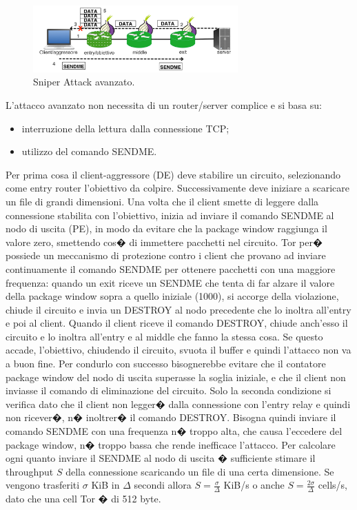 \begin{figure}[!htbp]
\centering
\includegraphics[width=0.7\textwidth]{./figure//sniperattack-advance+sendme}
\caption{Sniper Attack avanzato.}
\label{FIG:SniperAttackAdv }
\end{figure}

L'attacco avanzato non necessita di un router/server complice e si basa su:
\begin{itemize}
\item interruzione della lettura dalla connessione TCP;
\item utilizzo del comando {\ttfamily SENDME}.
\end{itemize}
Per prima cosa il client-aggressore (DE) deve stabilire un circuito, selezionando come entry router l'obiettivo da colpire. Successivamente deve iniziare a scaricare un file di grandi dimensioni.
Una volta che il client smette di leggere dalla connessione stabilita con l'obiettivo, inizia ad inviare il comando {\ttfamily SENDME} al nodo di uscita (PE), in modo da evitare che la package window raggiunga il valore zero, smettendo cos� di immettere pacchetti nel circuito.
Tor per� possiede un meccanismo di protezione contro i client che provano ad inviare continuamente il comando {\ttfamily SENDME} per ottenere pacchetti con una maggiore frequenza: quando un exit riceve un {\ttfamily SENDME} che tenta di far alzare il valore della package window sopra a quello iniziale (1000), si accorge della violazione, chiude il circuito e invia un {\ttfamily DESTROY} al nodo precedente che lo inoltra all'entry e poi al client. Quando il client riceve il comando {\ttfamily DESTROY}, chiude anch'esso il circuito e lo inoltra all'entry e al middle che fanno la stessa cosa. Se questo accade, l'obiettivo, chiudendo il circuito, svuota il buffer e quindi l'attacco non va a buon fine. Per condurlo con successo bisognerebbe evitare che il contatore package window del nodo di uscita superasse la soglia iniziale, e che il client non inviasse il comando di eliminazione del circuito. Solo la seconda condizione si verifica dato che il client non legger� dalla connessione con l'entry relay e quindi non ricever�, n� inoltrer� il comando {\ttfamily DESTROY}. Bisogna quindi inviare il comando {\ttfamily SENDME} con una frequenza n� troppo alta, che causa l'eccedere del package window, n� troppo bassa che rende inefficace l'attacco.  Per calcolare ogni quanto inviare il {\ttfamily SENDME} al nodo di uscita � sufficiente stimare il throughput $S$ della connessione scaricando un file di una certa dimensione. Se vengono trasferiti $\sigma$ KiB in $\Delta$ secondi allora $S=\frac{\sigma}{\Delta}$ KiB/s o anche $S=\frac{2\sigma}{\Delta}$ cells/s, dato che una cell Tor � di 512 byte.
